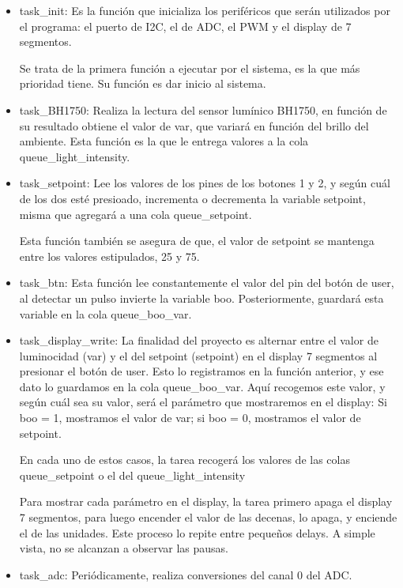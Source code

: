 \documentclass[conference]{IEEEtran}
\begin{document}
        \begin{itemize}
            \item task\_init:
            Es la función que inicializa los periféricos que serán utilizados por el programa: el puerto de I2C, el de ADC, el PWM y el display de 7 segmentos.\par
            Se trata de la primera función a ejecutar por el sistema, es la que más prioridad tiene. Su función es dar inicio al sistema.\par
            
            \item task\_BH1750: Realiza la lectura del sensor lumínico BH1750, en función de su resultado obtiene el valor de var, que variará en función del brillo del ambiente. Esta función es la que le entrega valores a la cola queue\_light\_intensity.\par

            \item task\_setpoint: Lee los valores de los pines de los botones 1 y 2, y según cuál de los dos esté presioado, incrementa o decrementa la variable setpoint, misma que agregará a una cola queue\_setpoint.\par
            Esta función también se asegura de que, el valor de setpoint se mantenga entre los valores estipulados, 25 y 75.\par
            
            \item task\_btn: Esta función lee constantemente el valor del pin del botón de user, al detectar un pulso invierte la variable boo. Posteriormente, guardará esta variable en la cola queue\_boo\_var.\par
            
            \item task\_display\_write: La finalidad del proyecto es alternar entre el valor de luminocidad (var) y el del setpoint (setpoint) en el display 7 segmentos al presionar el botón de user. Esto lo registramos en la función anterior, y ese dato lo guardamos en la cola queue\_boo\_var. Aquí recogemos este valor, y según cuál sea su valor, será el parámetro que mostraremos en el display: Si boo = 1, mostramos el valor de var; si boo = 0, mostramos el valor de setpoint.\par
            En cada uno de estos casos, la tarea recogerá los valores de las colas queue\_setpoint o el del queue\_light\_intensity\par
            Para mostrar cada parámetro en el display, la tarea primero apaga el display 7 segmentos, para luego encender el valor de las decenas, lo apaga, y enciende el de las unidades. Este proceso lo repite entre pequeños delays. A simple vista, no se alcanzan a observar las pausas.\par           
            \item task\_adc:
            Periódicamente, realiza conversiones del canal 0 del ADC.\par
            

\end{itemize}
\end{document}
